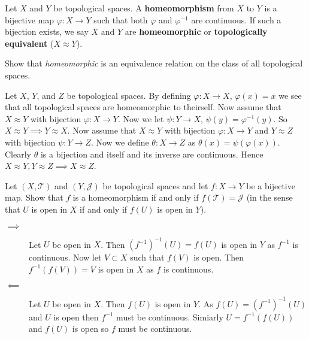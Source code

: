 \begin{definition}[Homeomorphism]
	Let $X$ and $Y$ be topological spaces.
	A \textbf{homeomorphism} from $X$ to $Y$ is a bijective map
	$\varphi: X \to Y$ such that both $\varphi$ and $\varphi^{-1}$
	are continuous.
	If such a bijection exists, we say $X$ and $Y$ are \textbf{homeomorphic} or
	\textbf{topologically equivalent} ($X \approx Y$).
\end{definition}

\begin{problem}
	Show that \emph{homeomorphic} is an equivalence relation on the class of all
	topological spaces.
\end{problem}

\begin{solution}
	Let $X$, $Y$, and $Z$ be topological spaces.
	By defining $\varphi: X \to X$, $\varphi(x) = x$ we see that all topological
	spaces are homeomorphic to theirself.
	Now assume that $X \approx Y$ with bijection $\varphi: X \to Y$.
	Now we let $\psi: Y \to X$, $\psi(y) = \varphi^{-1}(y)$.
	So $X \approx Y \implies Y \approx X$.
	Now assume that $X \approx Y$ with bijection $\varphi: X \to Y$
	and $Y \approx Z$ with bijection $\psi: Y \to Z$.
	Now we define $\theta: X \to Z$ as $\theta(x) = \psi(\varphi(x))$.
	Clearly $\theta$ is a bijection and itself and its inverse are continuous.
	Hence $X \approx Y, Y \approx Z \implies X \approx Z$.
\end{solution}

\begin{problem}
	\label{prob:homeo-preserves-openness}
	Let $(X, \mathcal T)$ and $(Y, \mathcal J)$ be topological spaces
	and let $f: X \to Y$ be a bijective map.
	Show that $f$ is a homeomorphism if and only if
	$f(\mathcal T) = \mathcal J$ (in the sense that $U$ is open in $X$ if
	and only if $f(U)$ is open in $Y$).
\end{problem}

\begin{solution}
	\hfill
	\begin{description}
		\item[$\implies$] 
			Let $U$ be open in $X$.
			Then $
				\left( f^{-1} \right)^{-1}(U) = f(U)
			$ is open in $Y$ as $f^{-1}$ is continuous.
			Now let $V \subset X$ such that $f(V)$ is open.
			Then $
			f^{-1}(f(V)) = V
			$ is open in $X$ as $f$ is continuous.

		\item[$\impliedby$]
			Let $U$ be open in $X$. Then $f(U)$ is open in $Y$.
			As $
				f(U) = \left( f^{-1} \right)^{-1}(U)
			$ and $U$ is open then $f^{-1}$ must be continuous.
			Simiarly $
				U = f^{-1}(f(U))
			$ and $f(U)$ is open so $f$ must be continuous.
	\end{description}
\end{solution}

